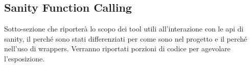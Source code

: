 \subsection{Sanity Function Calling}

Sotto-sezione che riporterà lo scopo dei tool utili all'interazione con le api di sanity, il perché sono stati differenziati per come sono nel progetto e il perché nell'uso di wrappers.
Verranno riportati porzioni di codice per agevolare l'esposizione.

